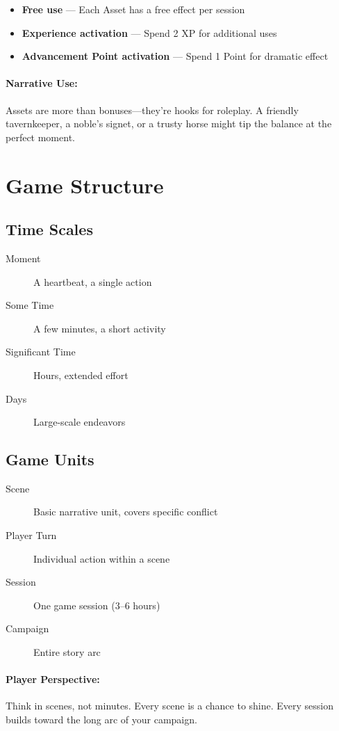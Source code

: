 \begin{multicols}{2}
\begin{itemize}
  \item \textbf{Free use} — Each Asset has a free effect per session
  \item \textbf{Experience activation} — Spend 2 XP for additional uses
  \item \textbf{Advancement Point activation} — Spend 1 Point for dramatic effect
\end{itemize}

\paragraph{Narrative Use:}  
Assets are more than bonuses—they’re hooks for roleplay. A friendly tavernkeeper, a noble’s signet, or a trusty horse might tip the balance at the perfect moment.

\section{Game Structure} 

\subsection*{Time Scales}
\begin{description}
  \item[Moment] A heartbeat, a single action
  \item[Some Time] A few minutes, a short activity
  \item[Significant Time] Hours, extended effort
  \item[Days] Large-scale endeavors
\end{description}

\subsection*{Game Units}
\begin{description}
  \item[Scene] Basic narrative unit, covers specific conflict
  \item[Player Turn] Individual action within a scene
  \item[Session] One game session (3--6 hours)
  \item[Campaign] Entire story arc
\end{description}

\paragraph{Player Perspective:}  
Think in scenes, not minutes. Every scene is a chance to shine. Every session builds toward the long arc of your campaign.


\end{multicols}
